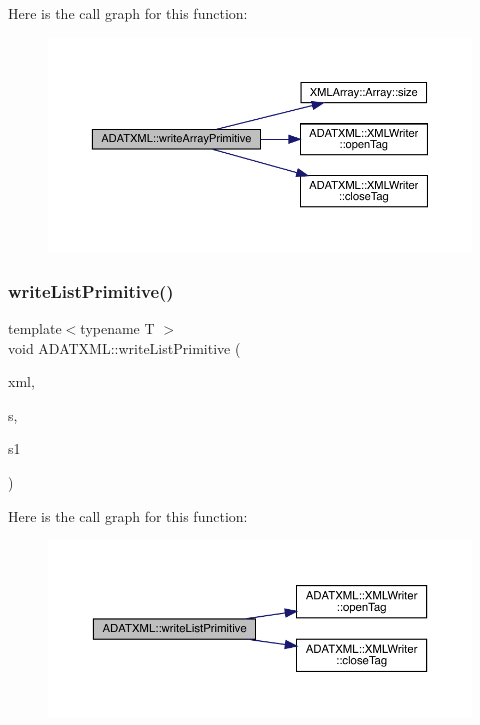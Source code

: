 Here is the call graph for this function\+:\nopagebreak
\begin{figure}[H]
\begin{center}
\leavevmode
\includegraphics[width=350pt]{d7/da0/namespaceADATXML_a6f40a822deea06e9a305fee4e7d89a17_cgraph}
\end{center}
\end{figure}
\mbox{\label{namespaceADATXML_a5b78d711d4d08d62696771f2f4187384}} 
\subsubsection{\texorpdfstring{writeListPrimitive()}{writeListPrimitive()}}
{\footnotesize\ttfamily template$<$typename T $>$ \\
void A\+D\+A\+T\+X\+M\+L\+::write\+List\+Primitive (\begin{DoxyParamCaption}\item[{\mbox{\hyperlink{classADATXML_1_1XMLWriter}{X\+M\+L\+Writer}} \&}]{xml,  }\item[{const std\+::string \&}]{s,  }\item[{const std\+::list$<$ T $>$ \&}]{s1 }\end{DoxyParamCaption})}

Here is the call graph for this function\+:\nopagebreak
\begin{figure}[H]
\begin{center}
\leavevmode
\includegraphics[width=350pt]{d7/da0/namespaceADATXML_a5b78d711d4d08d62696771f2f4187384_cgraph}
\end{center}
\end{figure}
\mbox{\label{namespaceADATXML_ac21baf6aebab16f5e0425a455d5868a6}} 
